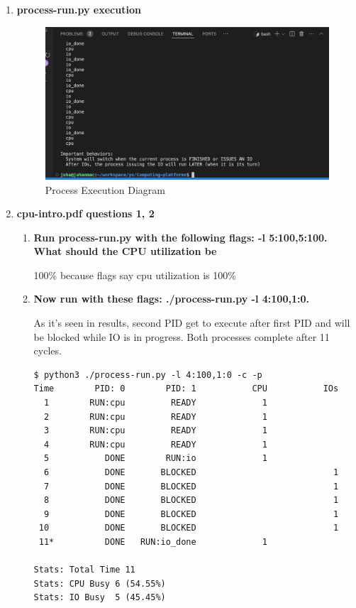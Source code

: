 \documentclass{article}
\begin{document}
\begin{enumerate}[label=\textbf{\alph*})]
    \item \textbf{process-run.py execution}
    \begin{figure}[ht]
        \centering
        \includegraphics[width=\textwidth]{process-run-py.jpg}
        \caption{Process Execution Diagram}
        \label{fig:process-run-py}
    \end{figure}
    \item \textbf{cpu-intro.pdf questions 1, 2}

    \begin{enumerate}[label=\textbf{\arabic*}), start=1]
        \item
        {\bf Run process-run.py with the following flags:
        -l 5:100,5:100. What should the CPU utilization be}

        100\% because flags say cpu utilization is 100\%
        \item
        {\bf Now run with these flags: ./process-run.py
        -l 4:100,1:0.}

        As it's seen in results, second PID get to execute
        after first PID and will be blocked while IO is in
        progress. Both processes complete after 11 cycles.

        {\scriptsize
        \begin{verbatim}
$ python3 ./process-run.py -l 4:100,1:0 -c -p
Time        PID: 0        PID: 1           CPU           IOs
  1        RUN:cpu         READY             1          
  2        RUN:cpu         READY             1          
  3        RUN:cpu         READY             1          
  4        RUN:cpu         READY             1          
  5           DONE        RUN:io             1          
  6           DONE       BLOCKED                           1
  7           DONE       BLOCKED                           1
  8           DONE       BLOCKED                           1
  9           DONE       BLOCKED                           1
 10           DONE       BLOCKED                           1
 11*          DONE   RUN:io_done             1          

Stats: Total Time 11
Stats: CPU Busy 6 (54.55%)
Stats: IO Busy  5 (45.45%)
        \end{verbatim}
        }

    \end{enumerate}
\end{enumerate}
\end{document}
